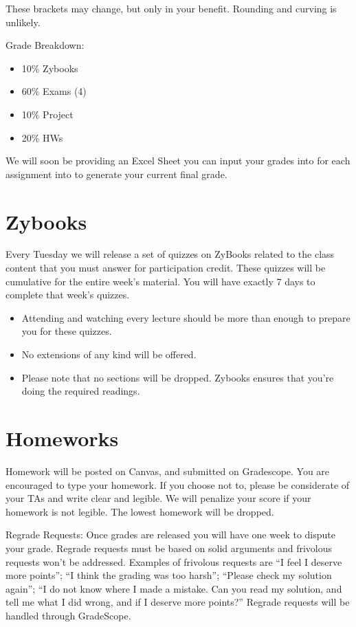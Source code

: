 \documentclass{article}
\begin{document}
These brackets may change, but only in your benefit. Rounding and curving is unlikely.

Grade Breakdown:

\begin{itemize}
    \item 10\% Zybooks
    \item 60\% Exams (4)
    \item 10\% Project
    \item 20\% HWs
\end{itemize}

We will soon be providing an Excel Sheet you can input your grades into for each assignment into to generate your current final grade.

\section{Zybooks}
Every Tuesday we will release a set of quizzes on ZyBooks related to the class content that you must answer for participation credit. These quizzes will be cumulative for the entire week's material.  You will have exactly 7 days to complete that week's quizzes.
\begin{itemize}
    \item Attending and watching every lecture should be more than enough to prepare you for these quizzes.
    \item No extensions of any kind will be offered.
    \item Please note that no sections will be dropped. Zybooks ensures that you're doing the required readings.
\end{itemize}


\section{Homeworks}

Homework will be posted on Canvas, and submitted on Gradescope. You are encouraged to type your homework. If you choose not to, please be considerate of your TAs and write clear and legible. We will penalize your score if your homework is not legible.  The lowest homework will be dropped.

Regrade Requests: Once grades are released you will have one week to dispute your grade. Regrade requests must be based on solid arguments and frivolous requests won’t be addressed. Examples of frivolous requests are “I feel I deserve more points”; “I think the grading was too harsh”; “Please check my solution again”; “I do not know where I made a mistake. Can you read my solution, and tell me what I did wrong, and if I deserve more points?”  Regrade requests will be handled through GradeScope.
\end{document}
